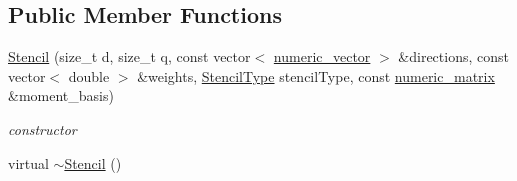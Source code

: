 \subsection*{Public Member Functions}
\begin{DoxyCompactItemize}
\item 
\hyperlink{classnatrium_1_1Stencil_ac521a427aca04be5a4962f3f23e17cd5}{Stencil} (size\_\-t d, size\_\-t q, const vector$<$ \hyperlink{namespacenatrium_a67c39077adc6634f8fa3762b8eef24c4}{numeric\_\-vector} $>$ \&directions, const vector$<$ double $>$ \&weights, \hyperlink{namespacenatrium_a45d5dacaf5eb5efde670179d949173ba}{StencilType} stencilType, const \hyperlink{namespacenatrium_ad8cbec7aab93a74837b06ded39615d47}{numeric\_\-matrix} \&moment\_\-basis)
\begin{DoxyCompactList}\small\item\em constructor \item\end{DoxyCompactList}\item 
\hypertarget{classnatrium_1_1Stencil_aff8956ea1dca43ed70f513baa755331f}{
virtual \hyperlink{classnatrium_1_1Stencil_aff8956ea1dca43ed70f513baa755331f}{$\sim$Stencil} ()}
\label{classnatrium_1_1Stencil_aff8956ea1dca43ed70f513baa755331f}


\end{DoxyCompactItemize}

